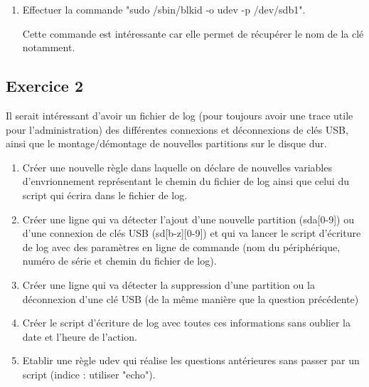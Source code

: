 \documentclass[11pt]{article}
\begin{document}
\begin{enumerate}
	
	\item Effectuer la commande "sudo /sbin/blkid -o udev -p /dev/sdb1".
	
	 \bigskip
	
	Cette commande est intéressante car elle permet de récupérer le nom de la clé notamment. 
	
\end{enumerate}

\subsection*{Exercice 2}

Il serait intéressant d'avoir un fichier de log (pour toujours avoir une trace utile pour l'administration) 
des différentes connexions et déconnexions de clés USB, ainsi que le montage/démontage de nouvelles partitions
sur le disque dur. 

\begin{enumerate}
	\item Créer une nouvelle règle dans laquelle on déclare de nouvelles variables d'envrionnement représentant le 
	chemin du fichier de log ainsi que celui du script qui écrira dans le fichier de log. 
	\item Créer une ligne qui va détecter l'ajout d'une nouvelle partition (sda[0-9]) ou d'une connexion de clés USB (sd[b-z][0-9])
	et qui va lancer le script d'écriture de log avec des paramètres en ligne de commande (nom du périphérique, numéro de série et chemin du fichier de log).
	\item Créer une ligne qui va détecter la suppression d'une partition ou la déconnexion d'une clé USB (de la même manière que la question précédente)
	
	 \bigskip
	
	\item Créer le script d'écriture de log avec toutes ces informations sans oublier la date et l'heure de l'action.
	
	 \bigskip
	
	\item Etablir une règle udev qui réalise les questions antérieures sans passer par un script (indice : utiliser "echo").
	
	 \bigskip

\end{enumerate}
\end{document}
